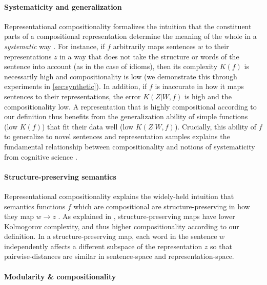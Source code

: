 \documentclass{article} %
\newcommand{\Comp}{Representational compositionality}
\begin{document}
\paragraph{Systematicity and generalization}

\Comp{} formalizes the intuition that the constituent parts of a compositional representation determine the meaning of the whole in a \emph{systematic} way \citep{sep-compositionality,gendler2012case}. For instance, if $f$ arbitrarily maps sentences $w$ to their representations $z$ in a way that does not take the structure or words of the sentence into account (as in the case of idioms), then its complexity $K(f)$ is necessarily high and compositionality is low (we demonstrate this through experiments in \cref{sec:synthetic}). In addition, if $f$ is inaccurate in how it maps sentences to their representations, the error $K(Z|W,f)$ is high and the compositionality low. A representation that is highly compositional according to our definition thus benefits from the generalization ability of simple functions (low $K(f)$) that fit their data well (low $K(Z|W,f)$). Crucially, this ability of $f$ to generalize to novel sentences and representation samples explains the fundamental relationship between compositionality and notions of systematicity from cognitive science \citep{sep-compositionality}.

\paragraph{Structure-preserving semantics}

\Comp{} explains the widely-held intuition that semantics functions $f$ which are compositional are structure-preserving in how they map $w \rightarrow z$ \citep{montague1970english}. As explained in \citet{ren2023improving}, structure-preserving maps have lower Kolmogorov complexity, and thus higher compositionality according to our definition. In a structure-preserving map, each word in the sentence $w$ independently affects a different subspace of the representation $z$ so that pairwise-distances are similar in sentence-space and representation-space. 

\paragraph{Modularity \& compositionality}
\end{document}
